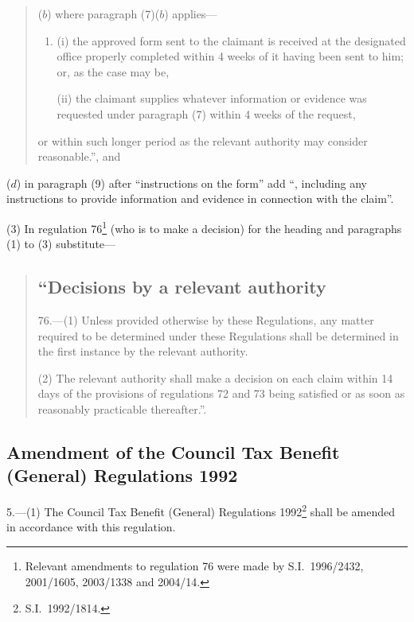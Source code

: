 \documentclass[12pt,a4paper]{article}
\begin{document}
\begin{enumerate}
\begin{quotation}
\begin{enumerate}
($b$) where paragraph (7)($b$)  applies—
\begin{enumerate}\item[]
(i) the approved form sent to the claimant is received at the designated office properly completed within 4 weeks of it having been sent to him; or, as the case may be,

(ii) the claimant supplies whatever information or evidence was requested under paragraph (7) within 4 weeks of the request,
\end{enumerate}
or within such longer period as the relevant authority may consider reasonable.”, and
\end{enumerate}
\end{quotation}

($d$) in paragraph (9) after “instructions on the form” add “, including any instructions to provide information and evidence in connection with the claim”.
\end{enumerate}

(3) In regulation 76\footnote{Relevant amendments to regulation 76 were made by S.I.\ 1996/2432, 2001/1605, 2003/1338 and 2004/14.} (who is to make a decision) for the heading and paragraphs (1) to (3) substitute—
\begin{quotation}
\subsection*{“Decisions by a relevant authority}

76.---(1)  Unless provided otherwise by these Regulations, any matter required to be determined under these Regulations shall be determined in the first instance by the relevant authority.

(2) The relevant authority shall make a decision on each claim within 14 days of the provisions of regulations 72 and 73 being satisfied or as soon as reasonably practicable thereafter.”.
\end{quotation}

\subsection[5. Amendment of the Council Tax Benefit (General) Regulations 1992]{Amendment of the Council Tax Benefit (General) Regulations 1992}

5.---(1)  The Council Tax Benefit (General) Regulations 1992\footnote{S.I.\ 1992/1814.} shall be amended in accordance with this regulation.
\end{document}
